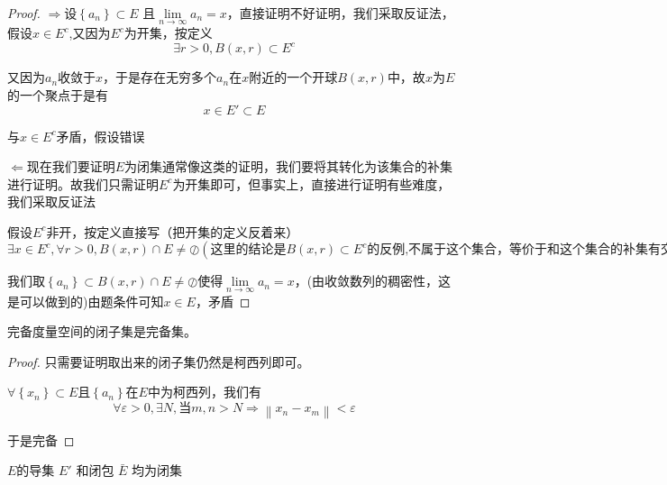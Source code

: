 \documentclass[lang=cn,10pt]{elegantbook}
\begin{document}
\begin{proof}
	$\Longrightarrow$设$\left\{ a_n \right\} \subset E$ 且$\underset{n\rightarrow \infty}{\lim}a_n=x$，直接证明不好证明，我们采取反证法，假设$x\in E^{c}$,又因为$E^{c}$为开集，按定义
	\begin{equation*}
		\exists r>0,B(x,r)\subset E^{c}
	\end{equation*}
	
	又因为$a_{n}$收敛于$x$，于是存在无穷多个$a_{n}$在$x$附近的一个开球$B(x,r)$中，故$x$为$E$的一个聚点于是有
	\begin{equation*}		
		x\in E' \subset E
	\end{equation*}
	
	与$x \in E^{c}$矛盾，假设错误
	
	$\Longleftarrow$现在我们要证明$E$为闭集通常像这类的证明，我们要将其转化为该集合的补集进行证明。故我们只需证明$E^{c}$为开集即可，但事实上，直接进行证明有些难度，我们采取反证法
	
	假设$E^{c}$非开，按定义直接写（把开集的定义反着来）
	\begin{equation*}
	\exists x \in E^{c},\forall r >0,B(x,r)\cap E\ne\oslash (\text{这里的结论是}B(x,r)\subset E^{c}\text{的反例,不属于这个集合，等价于和这个集合的补集有交集})
	\end{equation*}
	
	我们取$\left\{ a_n \right\} \subset B(x,r)\cap E\ne\oslash$使得$\underset{n\rightarrow \infty}{\lim}a_n=x$，(由收敛数列的稠密性，这是可以做到的)由题条件可知$x\in E$，矛盾

\end{proof}
\begin{corollary}
	完备度量空间的闭子集是完备集。
\end{corollary}
\begin{proof}
	只需要证明取出来的闭子集仍然是柯西列即可。
	
	$\forall \left\{ x_n \right\} \subset E$且$\left\{ a_n \right\}$在$E $中为柯西列，我们有
	\begin{equation*}
	\forall \varepsilon>0,\exists  N,\text{当}m,n>N\Rightarrow
	 \left\| x_n-x_m \right\| <\varepsilon 
	\end{equation*}
	
	于是完备
\end{proof}
\begin{theorem}
	$E $的导集 $E'$ 和闭包 $\bar E$ 均为闭集
\end{theorem}
\end{document}
